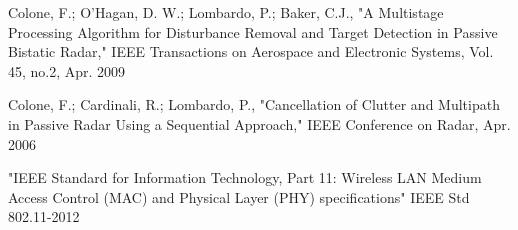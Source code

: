 \documentclass[article,11pt,onecolumn,final]{IEEEtran}
\begin{document}
\begin{thebibliography}{100}
 Colone, F.; O'Hagan, D. W.; Lombardo, P.; Baker, C.J., "A Multistage Processing Algorithm for Disturbance Removal and Target Detection in Passive Bistatic Radar," IEEE Transactions on Aerospace and Electronic Systems, Vol. 45, no.2, Apr. 2009

 Colone, F.; Cardinali, R.; Lombardo, P., "Cancellation of Clutter and Multipath in Passive Radar Using a Sequential Approach," IEEE Conference on Radar, Apr. 2006

\bibitem "IEEE Standard for Information Technology, Part 11: Wireless LAN Medium Access Control (MAC) and Physical Layer (PHY) specifications" IEEE Std 802.11-2012


\end{thebibliography}
\end{document}
